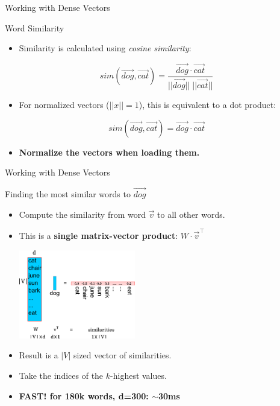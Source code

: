 \documentclass[compress]{beamer}
\begin{document}
\begin{frame}{Working with Dense Vectors}

    \begin{block}{Word Similarity}
        \begin{itemize}
            \item Similarity is calculated using \textit{cosine
                similarity}:
        \end{itemize}
        \[sim(\vec{dog}, \vec{cat}) = \frac{\vec{dog} \cdot \vec{cat}}{||\vec{dog}|| \; ||\vec{cat}||}\]
        \begin{itemize}
            \item For normalized vectors ($||x|| = 1$), this is equivalent to a
                dot product:
        \end{itemize}
        \[sim(\vec{dog}, \vec{cat}) = \vec{dog} \cdot \vec{cat}\]
        \begin{itemize}
            \item \textbf{Normalize the vectors when loading them.}
        \end{itemize}
    \end{block}


\end{frame}

\begin{frame}[fragile]{Working with Dense Vectors}
    \begin{block}{Finding the most similar words to $\vec{dog}$}
        \begin{itemize}
            \item Compute the similarity from word $\vec{v}$ to all other words.
                \pause
            \item This is a \textbf{single matrix-vector product}: $W \cdot \vec{v}^\top$
                \begin{center}
                    \includegraphics[width=0.4\textwidth]{distsim/Wv.png}
                \end{center}
                \pause
            \item Result is a $|V|$ sized vector of similarities.
            \item Take the indices of the $k$-highest values.
                \pause
            \item \textbf{FAST! for 180k words, d=300: $\sim$30ms}
        \end{itemize}
    \end{block}
\end{frame}
\end{document}
